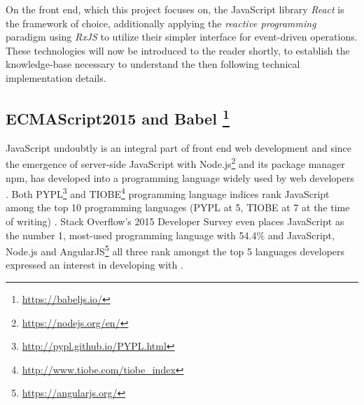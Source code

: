 On the front end, which this project focuses on, the JavaScript library \emph{React} is the framework of choice, additionally applying the \emph{reactive programming} paradigm using \emph{RxJS} to utilize their simpler interface for event-driven operations. These technologies will now be introduced to the reader shortly, to establish the knowledge-base necessary to understand the then following technical implementation details.

\subsection[ECMAScript2015 and Babel]%
             {ECMAScript2015 and Babel%
             \protect\footnote{\url{https://babeljs.io/}}}%
\label{sec:implementation-technologies-es6}
JavaScript undoubtly is an integral part of front end web development and since the emergence of server-side JavaScript with Node.js\footnote{\url{https://nodejs.org/en/}} and its package manager npm, has developed into a programming language widely used by web developers \cite{gpm-meta-transcompiler}. Both PYPL\footnote{\url{http://pypl.github.io/PYPL.html}} and TIOBE\footnote{\url{http://www.tiobe.com/tiobe_index}} programming language indices rank JavaScript among the top 10 programming languages (PYPL at 5, TIOBE at 7 at the time of writing) \cite{gpm-meta-transcompiler}. Stack Overflow's 2015 Developer Survey even places JavaScript as the number 1, most-used programming language with 54.4\% and JavaScript, Node.js and AngularJS\footnote{\url{https://angularjs.org/}} all three rank amongst the top 5 languages developers expressed an interest in developing with \cite{stackoverflow-developer-survey}.

